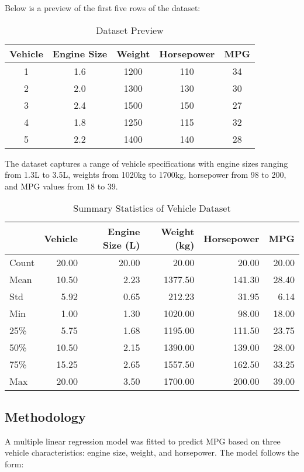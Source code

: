 \documentclass[12pt]{article}
\begin{document}
Below is a preview of the first five rows of the dataset:

\begin{table}[H]
\centering
\caption{Dataset Preview}
\begin{tabular}{ccccc}
\toprule
Vehicle & Engine Size & Weight & Horsepower & MPG \\
\midrule
1 & 1.6 & 1200 & 110 & 34 \\
2 & 2.0 & 1300 & 130 & 30 \\
3 & 2.4 & 1500 & 150 & 27 \\
4 & 1.8 & 1250 & 115 & 32 \\
5 & 2.2 & 1400 & 140 & 28 \\
\bottomrule
\end{tabular}
\end{table}

The dataset captures a range of vehicle specifications with engine sizes ranging from 1.3L to 3.5L, weights from 1020kg to 1700kg, horsepower from 98 to 200, and MPG values from 18 to 39.

\begin{table}[H]
\centering
\caption{Summary Statistics of Vehicle Dataset}
\begin{tabular}{lrrrrr}
\toprule
 & Vehicle & Engine Size (L) & Weight (kg) & Horsepower & MPG \\
\midrule
Count & 20.00 & 20.00 & 20.00 & 20.00 & 20.00 \\
Mean & 10.50 & 2.23 & 1377.50 & 141.30 & 28.40 \\
Std & 5.92 & 0.65 & 212.23 & 31.95 & 6.14 \\
Min & 1.00 & 1.30 & 1020.00 & 98.00 & 18.00 \\
25\% & 5.75 & 1.68 & 1195.00 & 111.50 & 23.75 \\
50\% & 10.50 & 2.15 & 1390.00 & 139.00 & 28.00 \\
75\% & 15.25 & 2.65 & 1557.50 & 162.50 & 33.25 \\
Max & 20.00 & 3.50 & 1700.00 & 200.00 & 39.00 \\
\bottomrule
\end{tabular}
\end{table}

\subsection{Methodology}
A multiple linear regression model was fitted to predict MPG based on three vehicle characteristics: engine size, weight, and horsepower. The model follows the form:
\end{document}
